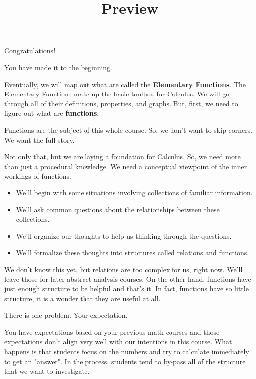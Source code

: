 \documentclass{ximera}
\title{Preview}
\begin{document}
\begin{abstract}
\end{abstract}

\maketitle



Congratulations!  

You have made it to the beginning. 


Eventually, we will map out what are called the \textbf{Elementary Functions}.  The Elementary Functions make up the basic toolbox for Calculus. We will go through all of their definitions, properties, and graphs. But, first, we need to figure out what are \textbf{functions}.

Functions are the subject of this whole course.  So, we don't want to skip corners.  We want the full story.  

Not only that, but we are laying a foundation for Calculus. So, we need more than just a procedural knowledge.  We need a conceptual viewpoint of the inner workings of functions.  

\begin{itemize}
\item We'll begin with some situations involving collections of familiar information.  
\item We'll ask common questions about the relationships between these collections.
\item We'll organize our thoughts to help us thinking through the questions.
\item We'll formalize these thoughts into structures called relations and functions.
\end{itemize}



We don't know this yet, but relations are too complex for us, right now. We'll leave those for later abstract analysis courses. On the other hand, functions have just enough structure to be helpful and that's it.  In fact, functions have so little structure, it is a wonder that they are useful at all.

There is one problem.  Your expectation.

You have expectations based on your previous math courses and those expectations don't align very well with our intentions in this course.  What happens is that students focus on the numbers and try to calculate immediately to get an "answer".  In the process, students tend to by-pass all of the structure that we want to investigate. 
\end{document}
